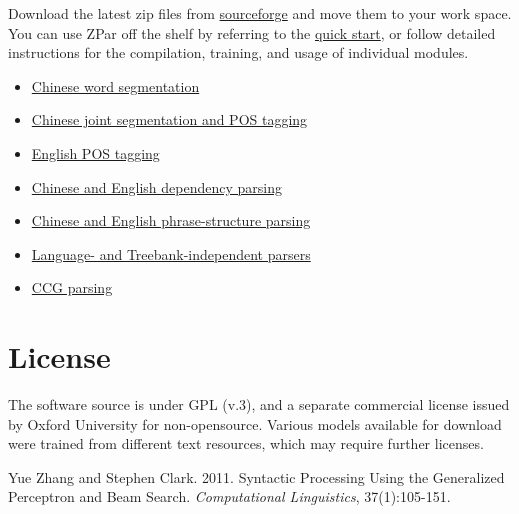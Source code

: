 \documentclass[12pt]{article}
\begin{document}
Download the latest zip files from \href{http://sourceforge.net/projects/zpar/}{sourceforge} and move them to your work space.
\\
You can use ZPar off the shelf by referring to the \href{doc/qs.html}{quick start}, or follow detailed instructions for the compilation, training, and usage of individual modules.
\begin{itemize}
\item \href{doc/segmentor.html}{Chinese word segmentation}
\item \href{doc/joint_seg_tag.html}{Chinese joint segmentation and POS tagging}
\item \href{doc/eng_tagger.html}{English POS tagging}
\item \href{doc/deppar.html}{Chinese and English dependency parsing}
\item  \href{doc/conparser.html}{Chinese and English phrase-structure parsing}
\item \href{doc/independent.html}{Language- and Treebank-independent parsers}
\item \href{doc/CCG.html}{CCG parsing}
\end{itemize}

\section{License}

The software source is under GPL (v.3), and a separate commercial license
issued by Oxford University for non-opensource. Various models available for
download were trained from different text resources, which may require further
licenses.

\begin{thebibliography}{99}
Yue Zhang and Stephen Clark. 2011. Syntactic Processing Using the Generalized Perceptron and Beam Search. \textit{Computational Linguistics}, 37(1):105-151.
\end{thebibliography}
\end{document}
